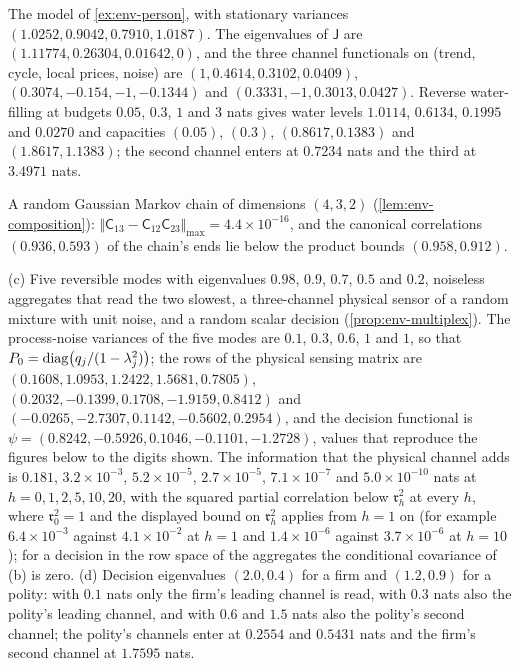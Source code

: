 \begin{numcheck}\label{chk:env-person}
The model of \cref{ex:env-person}, with stationary variances $(1.0252,0.9042,0.7910,1.0187)$. The eigenvalues of $\mathsf J$ are $(1.11774,0.26304,0.01642,0)$, and the three channel functionals on (trend, cycle, local prices, noise) are $(1,0.4614,0.3102,0.0409)$, $(0.3074,-0.154,-1,-0.1344)$ and $(0.3331,-1,0.3013,0.0427)$. Reverse water-filling at budgets $0.05$, $0.3$, $1$ and $3$ nats gives water levels $1.0114$, $0.6134$, $0.1995$ and $0.0270$ and capacities $(0.05)$, $(0.3)$, $(0.8617,0.1383)$ and $(1.8617,1.1383)$; the second channel enters at $0.7234$ nats and the third at $3.4971$ nats.
\end{numcheck}

\begin{numcheck}\label{chk:env-composition}
A random Gaussian Markov chain of dimensions $(4,3,2)$ (\cref{lem:env-composition}): $\Vert\mathsf C_{13}-\mathsf C_{12}\mathsf C_{23}\Vert_{\max}=4.4\times10^{-16}$, and the canonical correlations $(0.936,0.593)$ of the chain's ends lie below the product bounds $(0.958,0.912)$.
\end{numcheck}

\begin{numcheck}\label{chk:env-multiplex}
(c) Five reversible modes with eigenvalues $0.98$, $0.9$, $0.7$, $0.5$ and $0.2$, noiseless aggregates that read the two slowest, a three-channel physical sensor of a random mixture with unit noise, and a random scalar decision (\cref{prop:env-multiplex}). The process-noise variances of the five modes are $0.1$, $0.3$, $0.6$, $1$ and $1$, so that $P_0=\operatorname{diag}\bigl(q_j/(1-\lambda_j^2)\bigr)$; the rows of the physical sensing matrix are $(0.1608,1.0953,1.2422,1.5681,0.7805)$, $(0.2032,-0.1399,0.1708,-1.9159,0.8412)$ and $(-0.0265,-2.7307,0.1142,-0.5602,0.2954)$, and the decision functional is $\psi=(0.8242,-0.5926,0.1046,-0.1101,-1.2728)$, values that reproduce the figures below to the digits shown. The information that the physical channel adds is $0.181$, $3.2\times10^{-3}$, $5.2\times10^{-5}$, $2.7\times10^{-5}$, $7.1\times10^{-7}$ and $5.0\times10^{-10}$ nats at $h=0,1,2,5,10,20$, with the squared partial correlation below $\mathfrak r_h^2$ at every $h$, where $\mathfrak r_0^2=1$ and the displayed bound on $\mathfrak r_h^2$ applies from $h=1$ on (for example $6.4\times10^{-3}$ against $4.1\times10^{-2}$ at $h=1$ and $1.4\times10^{-6}$ against $3.7\times10^{-6}$ at $h=10$); for a decision in the row space of the aggregates the conditional covariance of (b) is zero. (d) Decision eigenvalues $(2.0,0.4)$ for a firm and $(1.2,0.9)$ for a polity: with $0.1$ nats only the firm's leading channel is read, with $0.3$ nats also the polity's leading channel, and with $0.6$ and $1.5$ nats also the polity's second channel; the polity's channels enter at $0.2554$ and $0.5431$ nats and the firm's second channel at $1.7595$ nats.
\end{numcheck}
